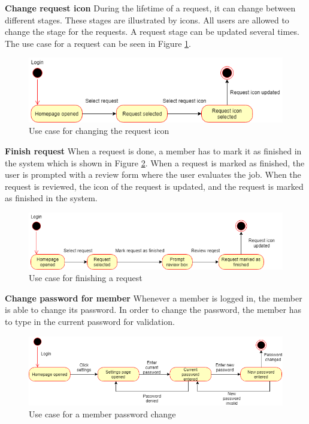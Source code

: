 \noindent
\textbf{Change request icon}\newline
During the lifetime of a request, it can change between different stages. These stages are illustrated by icons. All users are allowed   to change the stage for the requests. A request stage can be updated several times. The use case for a request can be seen in Figure \ref{fig:useCaseChangeRequestIcon}.
\begin{figure}[H]
    \centering
    \includegraphics[scale=0.6, clip]{figures/useCaseChangeRequestIcon.png}
    \caption{Use case for changing the request icon}
    \label{fig:useCaseChangeRequestIcon}
\end{figure}
\noindent
\textbf{Finish request}\newline
When a request is done, a member has to mark it as finished in the system which is shown in Figure \ref{fig:useCaseFinishRequest}. When a request is marked as finished, the user is prompted with a review form where the user evaluates the job. When the request is reviewed, the icon of the request is updated, and the request is marked as finished in the system.
\begin{figure}[H]
    \centering
    \includegraphics[scale=0.6, clip]{figures/useCaseFinishRequest.png}
    \caption{Use case for finishing a request}
    \label{fig:useCaseFinishRequest}
\end{figure}
\noindent
\textbf{Change password for member}\newline
Whenever a member is logged in, the member is able to change its password. In order to change the password, the member has to type in the current password for validation.
\begin{figure}[H]
    \centering
    \includegraphics[scale=0.6, clip]{figures/useCaseMemberChangePassword.png}
    \caption{Use case for a member password change}
    \label{fig:useCaseMemberChangePassword}
\end{figure}
